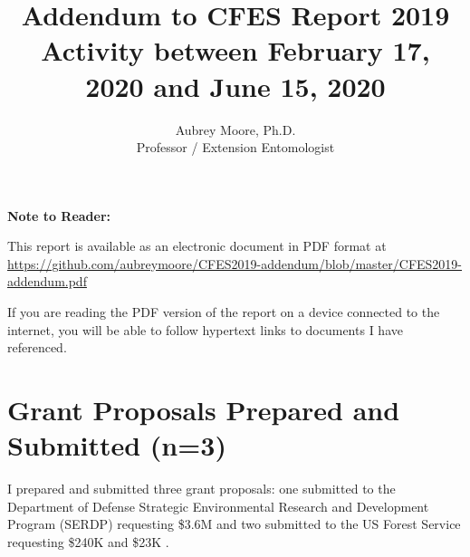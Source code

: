 

\usepackage[breaklinks=true, colorlinks=True, allcolors=blue]{hyperref}

\usepackage{indentfirst} 
\usepackage{comment}

\newcommand{\activities}{\medskip\textbf{Activities}}
\newcommand{\plans}{\medskip\textbf{Plans}}

\makeatletter

\makeatother




\title{Addendum to CFES Report 2019\\ \large{Activity between February 17, 2020 and June 15, 2020}}

\author{Aubrey Moore, Ph.D.\\
Professor / Extension Entomologist}

\maketitle

\textbf{Note to Reader:}

This report is available as an electronic document in PDF format at\\
\url{https://github.com/aubreymoore/CFES2019-addendum/blob/master/CFES2019-addendum.pdf}

If you are reading the PDF version of the report on a device connected
to the internet, you will be able to follow hypertext links to documents
I have referenced.

\setcounter{tocdepth}{2}
\tableofcontents{}

\clearpage

\section{Grant Proposals Prepared and Submitted (n=3)}
\begin{refsection}

I prepared and submitted three grant proposals: one submitted to the Department of Defense Strategic Environmental Research and Development Program (SERDP) requesting \$3.6M \cite{moore_serdp_2020-1} and two submitted to the US Forest Service requesting \$240K and \$23K \cite{moore_grant_2020-1, moore_grant_2020}.	

\printbibliography[heading=none]
\end{refsection} 


